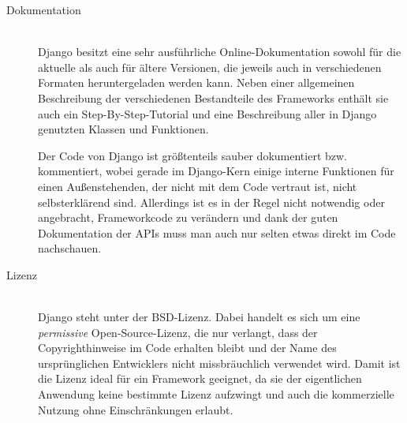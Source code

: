 \begin{description}
\item[Dokumentation] \hfill \\
Django besitzt eine sehr ausführliche Online-Dokumentation sowohl für die aktuelle als auch für
ältere Versionen, die jeweils auch in verschiedenen Formaten heruntergeladen werden kann. Neben
einer allgemeinen Beschreibung der verschiedenen Bestandteile des Frameworks enthält sie auch ein
Step-By-Step-Tutorial und eine Beschreibung aller in Django genutzten Klassen und Funktionen.

Der Code von Django ist größtenteils sauber dokumentiert bzw. kommentiert, wobei gerade im
Django-Kern einige interne Funktionen für einen Außenstehenden, der nicht mit dem Code vertraut ist,
nicht selbsterklärend sind. Allerdings ist es in der Regel nicht notwendig oder angebracht,
Frameworkcode zu verändern und dank der guten Dokumentation der APIs muss man auch nur selten etwas
direkt im Code nachschauen.


\item[Lizenz] \hfill \\
Django steht unter der BSD-Lizenz. Dabei handelt es sich um eine \emph{permissive}
Open-Source-Lizenz, die nur verlangt, dass der Copyrighthinweise im Code erhalten bleibt und der
Name des ursprünglichen Entwicklers nicht missbräuchlich verwendet wird. Damit ist die Lizenz ideal
für ein Framework geeignet, da sie der eigentlichen Anwendung keine bestimmte Lizenz aufzwingt und
auch die kommerzielle Nutzung ohne Einschränkungen erlaubt.


\end{description}
